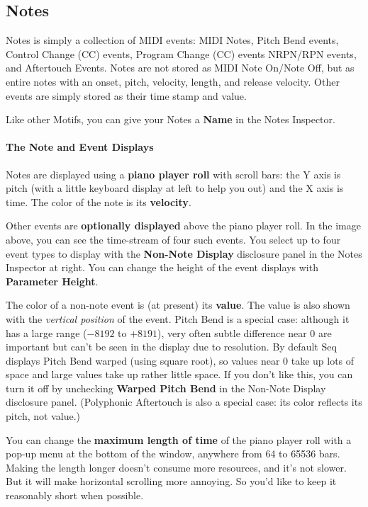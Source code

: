 \documentclass[twoside,10pt]{article}
\begin{document}
\subsection{Notes}
\label{notesmotif}
 
Notes is simply a collection of MIDI events: MIDI Notes, Pitch Bend events, Control Change (CC) events, Program Change (CC) events NRPN/RPN events, and Aftertouch Events.  Notes are not stored as MIDI Note On/Note Off, but as entire notes with an onset, pitch, velocity, length, and release velocity.   Other events are simply stored as their time stamp and value.  

Like other Motifs, you can give your Notes a {\bf Name} in the Notes Inspector.  

\paragraph{The Note and Event Displays}

Notes are displayed using a {\bf piano player roll} with scroll bars: the Y axis is pitch (with a little keyboard display at left to help you out) and the X axis is time.  The color of the note is its {\bf velocity}.  

Other events are {\bf optionally displayed} above the piano player roll.  In the image above, you can see the time-stream of four such events. You select up to four event types to display with the {\bf Non-Note Display} disclosure panel in the Notes Inspector at right.  You can change the height of the event displays with {\bf Parameter Height}.

The color of a non-note event is (at present) its {\bf value}.  The value is also shown with the {\it vertical position} of the event.  Pitch Bend is a special case: although it has a large range (\(-8192\) to \(+8191\)), very often subtle difference near 0 are important but can't be seen in the display due to resolution.  By default Seq displays Pitch Bend warped (using square root), so values near 0 take up lots of space and large values take up rather little space.  If you don't like this, you can turn it off by unchecking {\bf Warped Pitch Bend} in the Non-Note Display disclosure panel.  (Polyphonic Aftertouch is also a special case: its color reflects its pitch, not value.)

 You can change the {\bf maximum length of time} of the piano player roll with a pop-up menu at the bottom of the window, anywhere from 64 to 65536 bars.  Making the length longer doesn't consume more resources, and it's not slower.  But it will make horizontal scrolling more annoying.  So you'd like to keep it reasonably short when possible.
\end{document}
